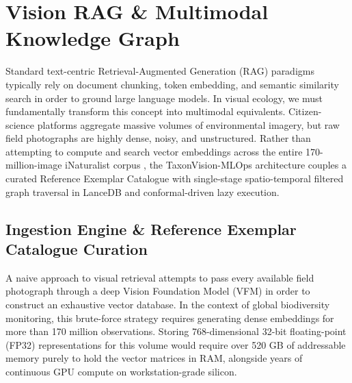 \chapter{Vision RAG \& Multimodal Knowledge Graph}
\label{ch:vision_rag}

Standard text-centric Retrieval-Augmented Generation (RAG) paradigms typically rely on document chunking, token embedding, and semantic similarity search in order to ground large language models. In visual ecology, we must fundamentally transform this concept into multimodal equivalents. Citizen-science platforms aggregate massive volumes of environmental imagery, but raw field photographs are highly dense, noisy, and unstructured. Rather than attempting to compute and search vector embeddings across the entire 170-million-image iNaturalist corpus \cite{vanhorn2018inaturalist}, the TaxonVision-MLOps architecture couples a curated Reference Exemplar Catalogue with single-stage spatio-temporal filtered graph traversal in LanceDB and conformal-driven lazy execution.

\section{Ingestion Engine \& Reference Exemplar Catalogue Curation}
\label{sec:exemplar_curation}

A naive approach to visual retrieval attempts to pass every available field photograph through a deep Vision Foundation Model (VFM) in order to construct an exhaustive vector database. In the context of global biodiversity monitoring, this brute-force strategy requires generating dense embeddings for more than 170 million observations. Storing 768-dimensional 32-bit floating-point (FP32) representations for this volume would require over 520 GB of addressable memory purely to hold the vector matrices in RAM, alongside years of continuous GPU compute on workstation-grade silicon.

